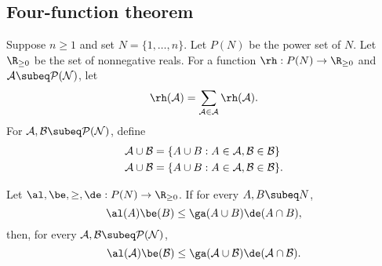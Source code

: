 
\subsection{Four-function theorem}
\begin{thm}
Suppose $n\ge 1$ and set $N=\{1,\ldots, n\}$. Let $P(N)$ be the power set of $N$. Let $\R_{\ge 0}$ be the set of nonnegative reals. For a function $\rh:P(N)\to \R_{\ge 0}$ and $\cal A\subeq P(N)$, let
\[
\rh(\cal A)=\sum_{A\in \cal A} \rh(A).
\]
For $\cal A,\cal B\subeq P(N)$, define
\begin{align*}
\cal A \cup \cal B&=\{A\cup B:A\in \cal A,B\in \cal B\}\\
\cal A \cup \cal B&=\{A\cup B:A\in \cal A,B\in \cal B\}.
\end{align*}

Let $\al,\be,\ge, \de:P(N)\to \R_{\ge0}$. If for every $A,B\subeq N$,
\begin{equation}\label{fft}
\al(A)\be(B)\le \ga(A\cup B)\de(A\cap B),
\end{equation}
then, for every $\cal A,\cal B\subeq P(N)$,
\begin{equation}\label{fft2}
\al(\cal A)\be(\cal B)\le \ga(\cal A\cup \cal B)\de(\cal A\cap \cal B).
\end{equation}
\end{thm}
